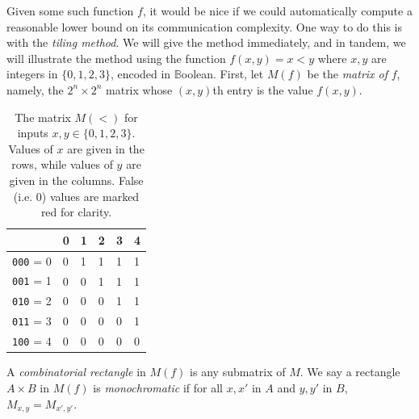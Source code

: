 \documentclass[12pt]{article}
\begin{document}
Given some such function $f$, it would be nice if we could automatically compute
a reasonable lower bound on its communication complexity.
One way to do this is with the \emph{tiling method}.
We will give the method immediately, and in tandem, we will illustrate the method using
the function $f(x, y) = x < y$ where $x, y$ are integers in $\{ 0, 1, 2, 3 \}$, encoded in $\mathbb{B}$oolean.
First, let $M(f)$ be the \emph{matrix of }$f$,
	namely,
		the $2^n \times 2^n$ matrix whose $(x, y)$th entry
		is the value $f(x, y)$.

\begin{table}[h]
\centering
\begin{tabular}{|l|lllll|}
\hline
    & 0 & 1 & 2 & 3 & 4 \\\hline
\texttt{000} = 0   & \cellcolor{red!25}0 & \cellcolor{green!25}1 & \cellcolor{green!25}1 & \cellcolor{green!25}1 & \cellcolor{green!25}1 \\
\texttt{001} = 1   & \cellcolor{red!25}0 & \cellcolor{red!25}0 & \cellcolor{green!25}1 & \cellcolor{green!25}1 & \cellcolor{green!25}1 \\
\texttt{010} = 2   & \cellcolor{red!25}0 & \cellcolor{red!25}0 & \cellcolor{red!25}0 & \cellcolor{green!25}1 & \cellcolor{green!25}1 \\
\texttt{011} = 3   & \cellcolor{red!25}0 & \cellcolor{red!25}0 & \cellcolor{red!25}0 & \cellcolor{red!25}0 & \cellcolor{green!25}1 \\
\texttt{100} = 4   & \cellcolor{red!25}0 & \cellcolor{red!25}0 & \cellcolor{red!25}0 & \cellcolor{red!25}0 & \cellcolor{red!25}0\\\hline
\end{tabular}
\caption{The matrix $M(<)$ for inputs $x, y \in \{ 0, 1, 2, 3 \}$.  Values of $x$ are given in the rows, while values of $y$ are given in the columns.  False (i.e. 0) values are marked red for clarity.}
\end{table}

A \emph{combinatorial rectangle} in $M(f)$ is any submatrix of $M$.
We say a rectangle $A \times B$ in $M(f)$ is \emph{monochromatic}
if for all $x, x'$ in $A$ and $y, y'$ in $B$, $M_{x,y} = M_{x',y'}$.
\end{document}
